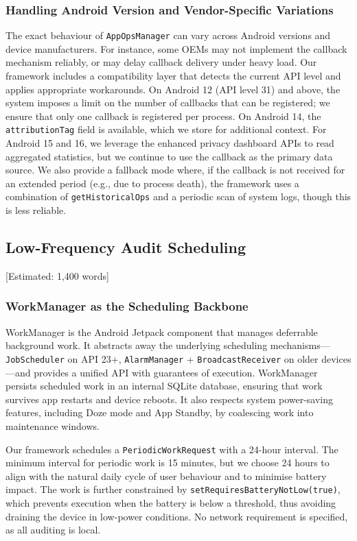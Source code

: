 \subsubsection{Handling Android Version and Vendor-Specific Variations}

The exact behaviour of \texttt{AppOpsManager} can vary across Android versions and device manufacturers. For instance, some OEMs may not implement the callback mechanism reliably, or may delay callback delivery under heavy load. Our framework includes a compatibility layer that detects the current API level and applies appropriate workarounds. On Android 12 (API level 31) and above, the system imposes a limit on the number of callbacks that can be registered; we ensure that only one callback is registered per process. On Android 14, the \texttt{attributionTag} field is available, which we store for additional context. For Android 15 and 16, we leverage the enhanced privacy dashboard APIs to read aggregated statistics, but we continue to use the callback as the primary data source. We also provide a fallback mode where, if the callback is not received for an extended period (e.g., due to process death), the framework uses a combination of \texttt{getHistoricalOps} and a periodic scan of system logs, though this is less reliable.

\subsection{Low-Frequency Audit Scheduling} [Estimated: 1,400 words]

\subsubsection{WorkManager as the Scheduling Backbone}

WorkManager is the Android Jetpack component that manages deferrable background work. It abstracts away the underlying scheduling mechanisms—\texttt{JobScheduler} on API 23+, \texttt{AlarmManager} + \texttt{BroadcastReceiver} on older devices—and provides a unified API with guarantees of execution. WorkManager persists scheduled work in an internal SQLite database, ensuring that work survives app restarts and device reboots. It also respects system power-saving features, including Doze mode and App Standby, by coalescing work into maintenance windows.

Our framework schedules a \texttt{PeriodicWorkRequest} with a 24-hour interval. The minimum interval for periodic work is 15 minutes, but we choose 24 hours to align with the natural daily cycle of user behaviour and to minimise battery impact. The work is further constrained by \texttt{setRequiresBatteryNotLow(true)}, which prevents execution when the battery is below a threshold, thus avoiding draining the device in low-power conditions. No network requirement is specified, as all auditing is local.

